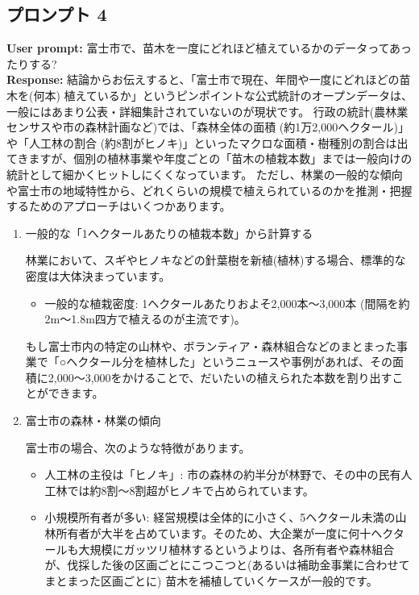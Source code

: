 \documentclass[a4paper, 11pt]{jsarticle}
\begin{document}
\subsection{プロンプト 4}
\noindent\textbf{User prompt:} 富士市で、苗木を一度にどれほど植えているかのデータってあったりする? \\
\noindent\textbf{Response:} 結論からお伝えすると、「富士市で現在、年間や一度にどれほどの苗木を(何本) 植えているか」というピンポイントな公式統計のオープンデータは、一般にはあまり公表・詳細集計されていないのが現状です。
行政の統計(農林業センサスや市の森林計画など)では、「森林全体の面積 (約1万2,000ヘクタール)」や「人工林の割合 (約8割がヒノキ)」といったマクロな面積・樹種別の割合は出てきますが、個別の植林事業や年度ごとの「苗木の植栽本数」までは一般向けの統計として細かくヒットしにくくなっています\cite{ref1,ref2,ref3}。
ただし、林業の一般的な傾向や富士市の地域特性から、どれくらいの規模で植えられているのかを推測・把握するためのアプローチはいくつかあります。
\begin{enumerate}
    \item 一般的な「1ヘクタールあたりの植栽本数」から計算する
    
    林業において、スギやヒノキなどの針葉樹を新植(植林)する場合、標準的な密度は大体決まっています。
    \begin{itemize}
        \item 一般的な植栽密度: 1ヘクタールあたりおよそ2,000本〜3,000本 (間隔を約2m〜1.8m四方で植えるのが主流です)。
    \end{itemize}
    もし富士市内の特定の山林や、ボランティア・森林組合などのまとまった事業で「○ヘクタール分を植林した」というニュースや事例があれば、その面積に2,000〜3,000をかけることで、だいたいの植えられた本数を割り出すことができます。

    \setcounter{enumi}{1}
    \item 富士市の森林・林業の傾向
    
    富士市の場合、次のような特徴があります。
    \begin{itemize}
        \item 人工林の主役は「ヒノキ」: 市の森林の約半分が林野で、その中の民有人工林では約8割〜8割超がヒノキで占められています\cite{ref2,ref3}。
        \item 小規模所有者が多い: 経営規模は全体的に小さく、5ヘクタール未満の山林所有者が大半を占めています。そのため、大企業が一度に何十ヘクタールも大規模にガッツリ植林するというよりは、各所有者や森林組合が、伐採した後の区画ごとにこつこつと(あるいは補助金事業に合わせてまとまった区画ごとに) 苗木を補植していくケースが一般的です\cite{ref3}。
    \end{itemize}
\end{enumerate}
\end{document}
